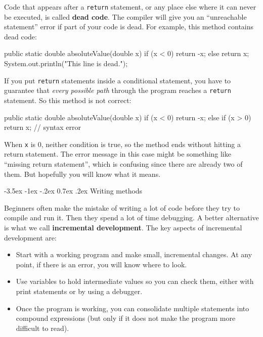 \documentclass[12pt]{book}
\makeatletter
\theoremstyle{exercise}
\newcommand{\java}[1]{\verb"#1"}
\renewcommand{\section}{\@startsection{section}{1}{\z@}%
    {-3.5ex \@plus -1ex \@minus -.2ex}%
    {0.7ex \@plus.2ex}%
    {\normalfont\Large\bfseries}}
\newcommand{\java}[1]{\lstinline{#1}} %
\makeatother
\begin{document}

Code that appears after a \java{return} statement, or any place else where it can never be executed, is called {\bf dead code}.
The compiler will give you an ``unreachable statement'' error if part of your code is dead.
For example, this method contains dead code:

\begin{code}
    public static double absoluteValue(double x) {
        if (x < 0) {
            return -x;
        } else {
            return x;
        }
        System.out.println("This line is dead.");
    }
\end{code}

If you put \java{return} statements inside a conditional statement, you have to guarantee that {\em every possible path} through the program reaches a \java{return} statement.
So this method is not correct:

\begin{code}
    public static double absoluteValue(double x) {
        if (x < 0) {
            return -x;
        } else if (x > 0) {
            return x;
        }
        // syntax error
    }
\end{code}

When \java{x} is 0, neither condition is true, so the method ends without hitting a return statement.
The error message in this case might be something like ``missing return statement'', which is confusing since there are already two of them.
But hopefully you will know what it means.


\section{Writing methods}
\label{distance}


Beginners often make the mistake of writing a lot of code before they try to compile and run it.
Then they spend a lot of time debugging.
A better alternative is what we call {\bf incremental development}.
The key aspects of incremental development are:

\begin{itemize}

\item Start with a working program and make small, incremental changes.
At any point, if there is an error, you will know where to look.

\item Use variables to hold intermediate values so you can check them, either with print statements or by using a debugger.

\item Once the program is working, you can consolidate multiple statements into compound expressions (but only if it does not make the program more difficult to read).

\end{itemize}
\end{document}
